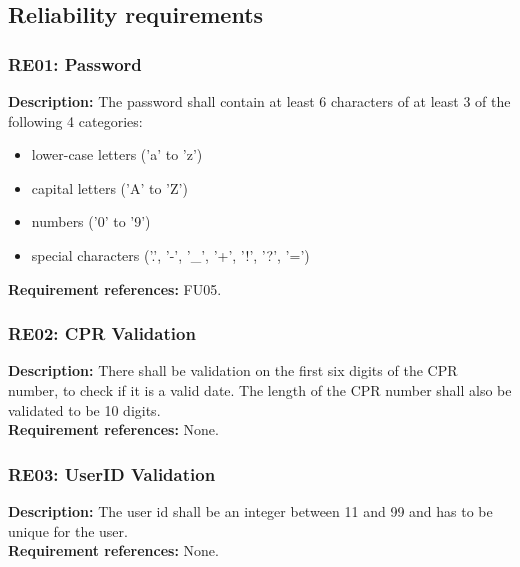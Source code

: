 \subsection{Reliability requirements}
\begin{adjustwidth}{2em}{0pt}

    \subsubsection*{RE01: Password}
    \begin{adjustwidth}{1em}{0pt}
        \textbf{Description:}
        The password shall contain at least 6 characters of at least 3 of the following 4 categories: 
        \begin{itemize}
            \item lower-case letters ('a' to 'z')
            \item capital letters ('A' to 'Z')
            \item numbers ('0' to '9')
            \item special  characters ('.', '-', '\_', '+', '!', '?', '=')
        \end{itemize}
        \textbf{Requirement references:}
        FU05.
    \end{adjustwidth}

    \subsubsection*{RE02: CPR Validation}
    \begin{adjustwidth}{1em}{0pt}
        \textbf{Description:}
        There shall be validation on the first six digits of the CPR number, to check if it is a valid date. The length of the CPR number shall also be validated to be 10 digits.\\
        \textbf{Requirement references:}
        None.
    \end{adjustwidth}

    \subsubsection*{RE03: UserID Validation}
    \begin{adjustwidth}{1em}{0pt}
        \textbf{Description:}
        The user id shall be an integer between 11 and 99 and has to be unique for the user.\\
        \textbf{Requirement references:}
        None.
    \end{adjustwidth}
    
\end{adjustwidth}

